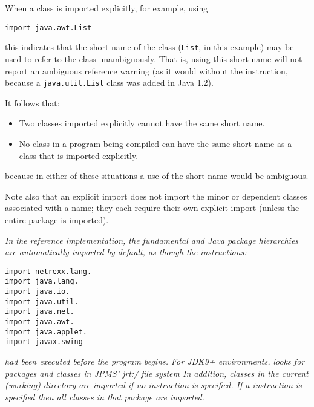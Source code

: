 When a class is imported explicitly, for example, using
\begin{lstlisting}
import java.awt.List
\end{lstlisting}
this indicates that the short name of the class (\texttt{List},
in this example) may be used to refer to the class unambiguously.
That is, using this short name will not report an ambiguous reference
warning (as it would without the  instruction, because
a \texttt{java.util.List} class was added in Java 1.2).
 
It follows that:
\begin{itemize}
\item Two classes imported explicitly cannot have the same short name.
\item No class in a program being compiled can have the same short name as
a class that is imported explicitly.
\end{itemize}
because in either of these situations a use of the short name would
be ambiguous.
 
Note also that an explicit import does not import the minor or dependent
classes associated with a name; they each require their own explicit
import (unless the entire package is imported).
 
\emph{In the reference implementation, the fundamental \nr{} and Java
package hierarchies are automatically imported by default, as though the
instructions:}
\begin{lstlisting}
import netrexx.lang.
import java.lang.
import java.io.
import java.util.
import java.net.
import java.awt.
import java.applet.
import javax.swing
\end{lstlisting}
\emph{had been executed before the program begins.
For JDK9+ environments, \nr{} looks for packages and classes in JPMS’
jrt:/ file system 
In addition, classes in the current (working) directory are imported if
no  instruction is specified.  If a 
instruction is specified then all classes in that package are imported.
}
